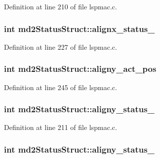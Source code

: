 Definition at line 210 of file lspmac.\-c.

\hypertarget{structmd2StatusStruct_a2feb35ceab8129fd2cc34d1104af8b8f}{
\subsubsection[{alignx\-\_\-status\-\_\-2}]{\setlength{\rightskip}{0pt plus 5cm}int md2\-Status\-Struct\-::alignx\-\_\-status\-\_}}\label{structmd2StatusStruct_a2feb35ceab8129fd2cc34d1104af8b8f}


Definition at line 227 of file lspmac.\-c.

\hypertarget{structmd2StatusStruct_a0d40a01d2aa93c443526e826440f77fc}{
\subsubsection[{aligny\-\_\-act\-\_\-pos}]{\setlength{\rightskip}{0pt plus 5cm}int md2\-Status\-Struct\-::aligny\-\_\-act\-\_\-pos}}\label{structmd2StatusStruct_a0d40a01d2aa93c443526e826440f77fc}


Definition at line 245 of file lspmac.\-c.

\hypertarget{structmd2StatusStruct_a2f2a11fe2fc7a446323def2be465185a}{
\subsubsection[{aligny\-\_\-status\-\_\-1}]{\setlength{\rightskip}{0pt plus 5cm}int md2\-Status\-Struct\-::aligny\-\_\-status\-\_}}\label{structmd2StatusStruct_a2f2a11fe2fc7a446323def2be465185a}


Definition at line 211 of file lspmac.\-c.

\hypertarget{structmd2StatusStruct_a1f98d8b9831e32d77129f9b0f1d7d255}{
\subsubsection[{aligny\-\_\-status\-\_\-2}]{\setlength{\rightskip}{0pt plus 5cm}int md2\-Status\-Struct\-::aligny\-\_\-status\-\_}}\label{structmd2StatusStruct_a1f98d8b9831e32d77129f9b0f1d7d255}


